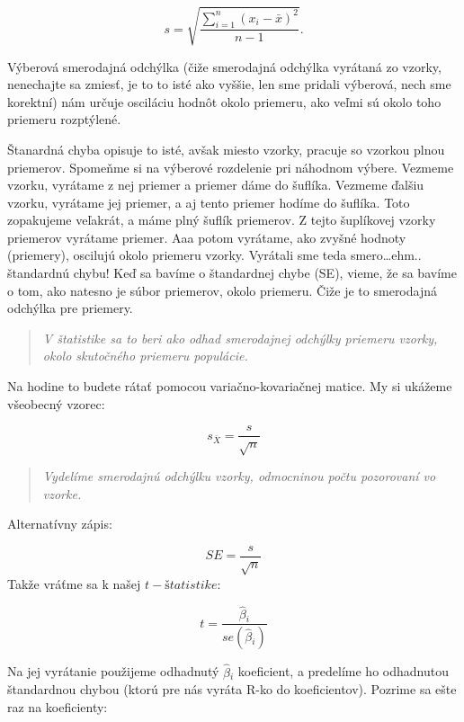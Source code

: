 \[s = \sqrt{\frac{\sum_{i=1}^{n} \left(x_{i} - \bar{x}\right)^{2}} {n-1}}.\]

Výberová smerodajná odchýlka (čiže smerodajná odchýlka vyrátaná zo
vzorky, nenechajte sa zmiesť, je to to isté ako vyššie, len sme pridali
výberová, nech sme korektní) nám určuje osciláciu hodnôt okolo priemeru,
ako veľmi sú okolo toho priemeru rozptýlené.

Štanardná chyba opisuje to isté, avšak miesto vzorky, pracuje so vzorkou
plnou priemerov. Spomeňme si na výberové rozdelenie pri náhodnom výbere.
Vezmeme vzorku, vyrátame z nej priemer a priemer dáme do šuflíka.
Vezmeme ďalšiu vzorku, vyrátame jej priemer, a aj tento priemer hodíme
do šuflíka. Toto zopakujeme veľakrát, a máme plný šuflík priemerov. Z
tejto šuplíkovej vzorky priemerov vyrátame priemer. Aaa potom vyrátame,
ako zvyšné hodnoty (priemery), oscilujú okolo priemeru vzorky. Vyrátali
sme teda smero\ldots ehm.. štandardnú chybu! Keď sa bavíme o štandardnej
chybe (SE), vieme, že sa bavíme o tom, ako natesno je súbor priemerov,
okolo priemeru. Čiže je to smerodajná odchýlka pre priemery.

\begin{quote}
\emph{V štatistike sa to beri ako odhad smerodajnej odchýlky priemeru
vzorky, okolo skutočného priemeru populácie.}
\end{quote}

Na hodine to budete rátať pomocou variačno-kovariačnej matice. My si
ukážeme všeobecný vzorec:

\[s_{\bar{X}} = \frac{s}{\sqrt{n}}\]

\begin{quote}
\emph{Vydelíme smerodajnú odchýlku vzorky, odmocninou počtu pozorovaní
vo vzorke.}
\end{quote}

Alternatívny zápis:

\[SE = \frac{s}{\sqrt{n}}\] Takže vráťme sa k našej \(t-štatistike\):

\[t = \frac{\hat\beta{}_i}{se(\hat\beta{}_i)}\]

Na jej vyrátanie použijeme odhadnutý \(\hat\beta{}_i\) koeficient, a
predelíme ho odhadnutou štandardnou chybou (ktorú pre nás vyráta R-ko do
koeficientov). Pozrime sa ešte raz na koeficienty:

\begin{Shaded}
\begin{Highlighting}[]
\OperatorTok{$}
\end{Highlighting}
\end{Shaded}

